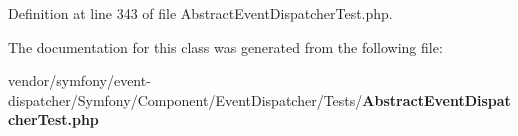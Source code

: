Definition at line 343 of file Abstract\+Event\+Dispatcher\+Test.\+php.



The documentation for this class was generated from the following file\+:\begin{DoxyCompactItemize}
\item 
vendor/symfony/event-\/dispatcher/\+Symfony/\+Component/\+Event\+Dispatcher/\+Tests/{\bf Abstract\+Event\+Dispatcher\+Test.\+php}\end{DoxyCompactItemize}
